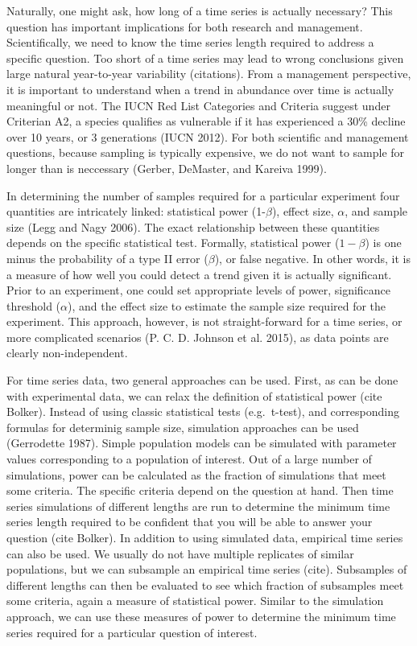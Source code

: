 \documentclass[12pt,]{article}
\begin{document}
Naturally, one might ask, how long of a time series is actually
necessary? This question has important implications for both research
and management. Scientifically, we need to know the time series length
required to address a specific question. Too short of a time series may
lead to wrong conclusions given large natural year-to-year variability
(citations). From a management perspective, it is important to
understand when a trend in abundance over time is actually meaningful or
not. The IUCN Red List Categories and Criteria suggest under Criterian
A2, a species qualifies as vulnerable if it has experienced a 30\%
decline over 10 years, or 3 generations (IUCN 2012). For both scientific
and management questions, because sampling is typically expensive, we do
not want to sample for longer than is neccessary (Gerber, DeMaster, and
Kareiva 1999).

In determining the number of samples required for a particular
experiment four quantities are intricately linked: statistical power
(1-\(\beta\)), effect size, \(\alpha\), and sample size (Legg and Nagy
2006). The exact relationship between these quantities depends on the
specific statistical test. Formally, statistical power (\(1-\beta\)) is
one minus the probability of a type II error (\(\beta\)), or false
negative. In other words, it is a measure of how well you could detect a
trend given it is actually significant. Prior to an experiment, one
could set appropriate levels of power, significance threshold
(\(\alpha\)), and the effect size to estimate the sample size required
for the experiment. This approach, however, is not straight-forward for
a time series, or more complicated scenarios (P. C. D. Johnson et al.
2015), as data points are clearly non-independent.

For time series data, two general approaches can be used. First, as can
be done with experimental data, we can relax the definition of
statistical power (cite Bolker). Instead of using classic statistical
tests (e.g.~t-test), and corresponding formulas for determinig sample
size, simulation approaches can be used (Gerrodette 1987). Simple
population models can be simulated with parameter values corresponding
to a population of interest. Out of a large number of simulations, power
can be calculated as the fraction of simulations that meet some
criteria. The specific criteria depend on the question at hand. Then
time series simulations of different lengths are run to determine the
minimum time series length required to be confident that you will be
able to answer your question (cite Bolker). In addition to using
simulated data, empirical time series can also be used. We usually do
not have multiple replicates of similar populations, but we can
subsample an empirical time series (cite). Subsamples of different
lengths can then be evaluated to see which fraction of subsamples meet
some criteria, again a measure of statistical power. Similar to the
simulation approach, we can use these measures of power to determine the
minimum time series required for a particular question of interest.
\end{document}
